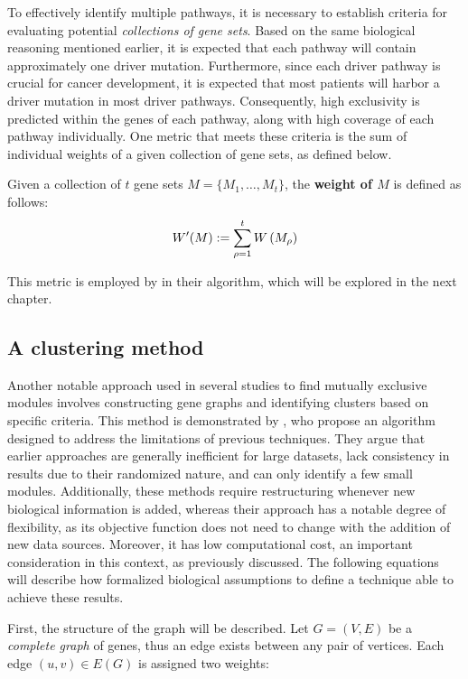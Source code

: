 To effectively identify multiple pathways, it is necessary to establish criteria for evaluating potential \textit{collections of gene sets}. Based on the same biological reasoning mentioned earlier, it is expected that each pathway will contain approximately one driver mutation. Furthermore, since each driver pathway is crucial for cancer development, it is expected that most patients will harbor a driver mutation in most driver pathways. Consequently, high exclusivity is predicted within the genes of each pathway, along with high coverage of each pathway individually. One metric that meets these criteria is the sum of individual weights of a given collection of gene sets, as defined below.

\begin{definition}
    Given a collection of $t$ gene sets $M = \{ M_1, \ldots, M_t \}$, the \textbf{weight of $M$} is defined as follows: $$W'(M) := \sum_{\rho = 1}^t{W \left(M_\rho\right)}$$
\end{definition}

This metric is employed by \textcite{multi-dendrix} in their algorithm, which will be explored in the next chapter.

\subsection{A clustering method} \label{c3_chap2}

Another notable approach used in several studies to find mutually exclusive modules involves constructing gene graphs and identifying clusters based on specific criteria. This method is demonstrated by \textcite{c3}, who propose an algorithm designed to address the limitations of previous techniques. They argue that earlier approaches are generally inefficient for large datasets, lack consistency in results due to their randomized nature, and can only identify a few small modules. Additionally, these methods require restructuring whenever new biological information is added, whereas their approach has a notable degree of flexibility, as its objective function does not need to change with the addition of new data sources. Moreover, it has low computational cost, an important consideration in this context, as previously discussed. The following equations will describe how \textcite{c3} formalized biological assumptions to define a technique able to achieve these results.

First, the structure of the graph will be described. Let $G = (V, E)$ be a \textit{complete graph} of genes, thus an edge exists between any pair of vertices. Each edge $(u, v) \in E(G)$ is assigned two weights:

